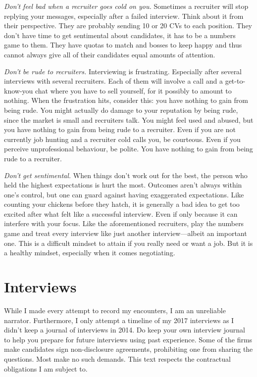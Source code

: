 \documentclass[a4paper]{article}
\begin{document}
\emph{Don't feel bad when a recruiter goes cold on you.}
Sometimes a recruiter will stop replying your messages, especially after a failed interview.
Think about it from their perspective.
They are probably sending 10 or 20 CVs to each position.
They don't have time to get sentimental about candidates, it has to be a numbers game to them.
They have quotas to match and bosses to keep happy and thus cannot always give all of their candidates equal amounts of attention.

\emph{Don't be rude to recruiters.}
Interviewing is frustrating. Especially after several interviews with several recruiters.
Each of them will involve a call and a get-to-know-you chat where you have to sell yourself, for it possibly to amount to nothing.
When the frustration hits, consider this:
you have nothing to gain from being rude.
You might actually do damage to your reputation by being rude, since the market is small and recruiters talk.
You might feel used and abused, but
you have nothing to gain from being rude to a recruiter.
Even if you are not currently job hunting and a recruiter cold calls you, be courteous.
Even if you perceive unprofessional behaviour, be polite.
You have nothing to gain from being rude to a recruiter.

\emph{Don't get sentimental.}
When things don't work out for the best, the person who held the highest expectations is hurt the most.
Outcomes aren't always within one's control, but one can guard against having exaggerated expectations.
Like counting your chickens before they hatch, it is generally a bad idea to get too excited after  what felt like a successful interview.
Even if only because it can interfere with your focus.
Like the aforementioned recruiters, play the numbers game and treat every interview like just another interview---albeit an important one.
This is a difficult mindset to attain if you really need or want a job.
But it is a healthy mindset, especially when it comes negotiating.


\section{Interviews}

While I made every attempt to record my encounters, I am an unreliable narrator.
Furthermore, I only attempt a timeline of my 2017 interviews as I didn't keep a journal of interviews in 2014.
Do keep your own interview journal to help you prepare for future interviews using past experience.
Some of the firms make candidates sign non-disclosure agreements, prohibiting one from sharing the questions.
Most make no such demands.
This text respects the contractual obligations I am subject to.
\end{document}
